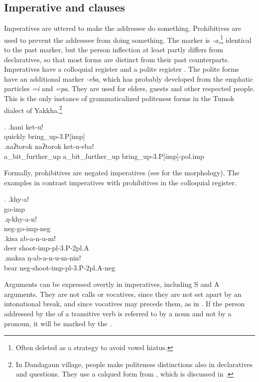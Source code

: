 \subsection{Imperative and  clauses}

Imperatives are uttered to make the addressee do something. Prohibitives are used to prevent the addressee from doing something. The  marker is \emph{-a},\footnote{Often deleted as a strategy to avoid vowel hiatus.} identical to the past marker, but the person inflection at least partly differs from declaratives, so that most forms are distinct from their past counterparts. Imperatives have a colloquial register \Next[a] and a polite register \Next[b]. The polite forms have an additional marker \emph{-eba}, which has probably developed from the emphatic particles \emph{=i} and \emph{=pa}. They are used for elders, guests and other respected people. This is the only instance of grammaticalized politeness forms in the Tumok dialect of Yakkha.\footnote{In Dandagaun village, people make politeness distinctions also in declaratives and questions. They use a calqued form from , which is discussed in .} 

\ex. \ag.hani ket-u!\\
quickly bring\_up{\sc -3.P[imp]}\\
\bg.naʔtorok naʔtorok ket-u-eba!\\
a\_bit\_further\_up a\_bit\_further\_up  bring\_up{\sc -3.P[imp]-pol.imp}\\

Formally, prohibitives are  negated imperatives (see  for the morphology). The examples in \Next contrast  imperatives with prohibitives in the colloquial register.

\ex. \ag.khy-a!\\
go{\sc -imp}\\
\bg.ŋ-khy-a-n!\\
{\sc neg-}go{\sc -imp-neg}\\
\bg.kisa ab-a-n-u-m!\\
deer shoot{\sc -imp-pl-3.P-2pl.A}\\
\bg.maksa ŋ-ab-a-n-u-m-nin!\\
bear {\sc neg-}shoot{\sc -imp-pl-3.P-2pl.A-neg}\\

Arguments can be expressed overtly in imperatives, including S and A arguments. They are not calls or vocatives, since they are not set apart by an intonational break, and since vocatives may precede them, as in \Next[a]. If the person addressed by the  of a transitive verb is referred to by a noun and not by a pronoun, it will be marked by the .

